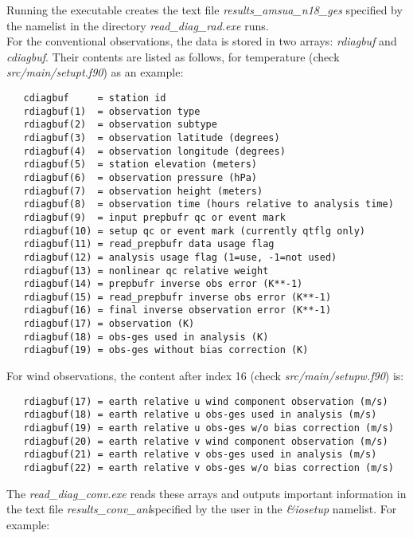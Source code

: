 Running the executable creates the text file \textit{results\_amsua\_n18\_ges} specified by the namelist in the directory \textit{read\_diag\_rad.exe} runs.\\

For the conventional observations, the data is stored in two arrays: \textit{rdiagbuf} and \textit{cdiagbuf}. Their contents are listed as follows, for temperature (check \textit{src/main/setupt.f90}) as an example:
\begin{scriptsize}
\begin{verbatim}
   cdiagbuf     = station id
   rdiagbuf(1)  = observation type
   rdiagbuf(2)  = observation subtype
   rdiagbuf(3)  = observation latitude (degrees)
   rdiagbuf(4)  = observation longitude (degrees)
   rdiagbuf(5)  = station elevation (meters)
   rdiagbuf(6)  = observation pressure (hPa)
   rdiagbuf(7)  = observation height (meters)
   rdiagbuf(8)  = observation time (hours relative to analysis time)
   rdiagbuf(9)  = input prepbufr qc or event mark
   rdiagbuf(10) = setup qc or event mark (currently qtflg only)
   rdiagbuf(11) = read_prepbufr data usage flag
   rdiagbuf(12) = analysis usage flag (1=use, -1=not used)
   rdiagbuf(13) = nonlinear qc relative weight
   rdiagbuf(14) = prepbufr inverse obs error (K**-1)
   rdiagbuf(15) = read_prepbufr inverse obs error (K**-1)
   rdiagbuf(16) = final inverse observation error (K**-1)
   rdiagbuf(17) = observation (K)
   rdiagbuf(18) = obs-ges used in analysis (K)
   rdiagbuf(19) = obs-ges without bias correction (K)
\end{verbatim}
\end{scriptsize}

For wind observations, the content after index 16  (check \textit{src/main/setupw.f90}) is:
\begin{scriptsize}
\begin{verbatim}
   rdiagbuf(17) = earth relative u wind component observation (m/s)
   rdiagbuf(18) = earth relative u obs-ges used in analysis (m/s)
   rdiagbuf(19) = earth relative u obs-ges w/o bias correction (m/s) 
   rdiagbuf(20) = earth relative v wind component observation (m/s)
   rdiagbuf(21) = earth relative v obs-ges used in analysis (m/s)
   rdiagbuf(22) = earth relative v obs-ges w/o bias correction (m/s) 
\end{verbatim}
\end{scriptsize}


The \textit{read\_diag\_conv.exe} reads these arrays and outputs important information in the text file \textit{results\_conv\_anl}specified by the user in the \textit{\&iosetup} namelist.  For example:

